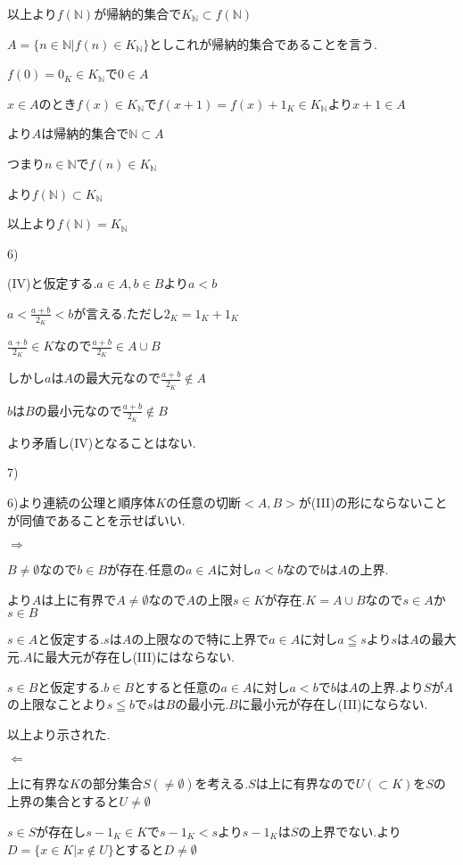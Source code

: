 \documentclass{jsarticle}
\begin{document}
以上より$f(\mathbb{N})$が帰納的集合で$K_{\mathbb{N}}\subset f(\mathbb{N})$

$A=\{n\in \mathbb{N}|f(n)\in K_{\mathbb{N}}\}$としこれが帰納的集合であることを言う.

$f(0)=0_K\in K_{\mathbb{N}}$で$0\in A$

$x\in A$のとき$f(x)\in K_{\mathbb{N}}$で$f(x+1)=f(x)+1_K\in K_{\mathbb{N}}$より$x+1\in A$

より$A$は帰納的集合で$\mathbb{N}\subset A$

つまり$n\in\mathbb{N}$で$f(n)\in K_{\mathbb{N}}$

より$f(\mathbb{N}) \subset K_{\mathbb{N}}$

以上より$f(\mathbb{N}) = K_{\mathbb{N}}$

6)

(IV)と仮定する.$a\in A,b\in B$より$a<b$

$a < \frac{a+b}{2_K} < b$が言える.ただし$2_K=1_K+1_K$

$\frac{a+b}{2_K}\in K$なので$\frac{a+b}{2_K}\in A \cup B$

しかし$a$は$A$の最大元なので$\frac{a+b}{2_K}\notin A$

$b$は$B$の最小元なので$\frac{a+b}{2_K}\notin B$

より矛盾し(IV)となることはない.

7)

6)より連続の公理と順序体$K$の任意の切断$<A,B>$が(III)の形にならないことが同値であることを示せばいい.

$\Rightarrow$

$B\neq \emptyset$なので$b\in B$が存在.任意の$a\in A$に対し$a < b$なので$b$は$A$の上界.

より$A$は上に有界で$A\neq \emptyset$なので$A$の上限$s\in K$が存在.$K=A\cup B$なので$s\in A$か$s\in B$

$s \in A$と仮定する.$s$は$A$の上限なので特に上界で$a\in A$に対し$a\leqq s$より$s$は$A$の最大元.$A$に最大元が存在し(III)にはならない.

$s\in B$と仮定する.$b\in B$とすると任意の$a\in A$に対し$a< b$で$b$は$A$の上界.より$S$が$A$の上限なことより$s\leqq b$で$s$は$B$の最小元.$B$に最小元が存在し(III)にならない.

以上より示された.

$\Leftarrow$

 上に有界な$K$の部分集合$S(\neq\emptyset)$を考える.$S$は上に有界なので$U(\subset K)$を$S$の上界の集合とすると$U\neq \emptyset$
 
 $s\in S$が存在し$s-1_K\in K$で$s-1_K< s$より$s-1_K$は$S$の上界でない.より$D=\{x\in K|x\notin U\}$とすると$D\neq \emptyset$
 
\end{document}
